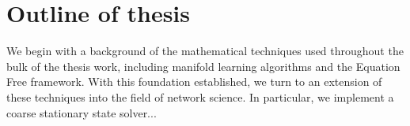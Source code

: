 
\section{Outline of thesis}

We begin with a background of the mathematical techniques used
throughout the bulk of the thesis work, including manifold learning
algorithms and the Equation Free framework. With this foundation
established, we turn to an extension of these techniques into the
field of network science. In particular, we implement a coarse
stationary state solver...